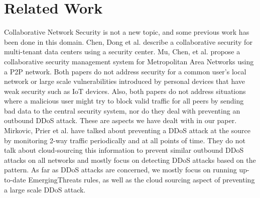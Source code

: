 \vspace{0.1in}
\section{Related Work}
\label{sec:related}

Collaborative Network Security is not a new topic, and some previous work has been done in this domain. Chen,  Dong et al. \cite {collaborative} describe a collaborative security for multi-tenant data centers using a security center. Mu, Chen, et al. \cite {metro} propose a collaborative security management system for Metropolitan Area Networks using a P2P network. Both papers do not address security for a common user's local network or large scale vulnerabilities introduced by personal devices that have weak security such as IoT devices. Also, both papers do not address situations where a malicious user might try to block valid traffic for all peers by sending bad data to the central security system, nor do they deal with preventing an outbound DDoS attack. These are aspects we have dealt with in our paper. Mirkovic, Prier et al. \cite{attackddos} have talked about preventing a DDoS attack at the source by monitoring 2-way traffic periodically and at all points of time. They do not talk about cloud-sourcing this information to prevent similar outbound DDoS attacks on all networks and mostly focus on detecting DDoS attacks based on the pattern. As far as DDoS attacks are concerned, we mostly focus on running up-to-date EmergingThreats rules, as well as the cloud sourcing aspect of preventing a large scale DDoS attack.